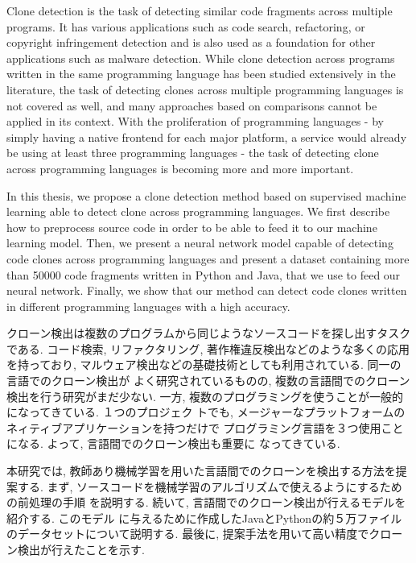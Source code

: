 \begin{eabstract}
Clone detection is the task of detecting similar code fragments across
multiple programs. It has various applications such as code search,
refactoring, or copyright infringement detection and is also used as a
foundation for other applications such as malware detection. While clone
detection across programs written in the same programming language has been
studied extensively in the literature, the task of detecting clones across
multiple programming languages is not covered as well, and many approaches
based on comparisons cannot be applied in its context. With the proliferation
of programming languages - by simply having a native frontend for each major
platform, a service would already be using at least three programming
languages - the task of detecting clone across programming languages is
becoming more and more important.

In this thesis, we propose a clone detection method based on supervised
machine learning able to detect clone across programming languages. We first
describe how to preprocess source code in order to be able to feed it to our
machine learning model. Then, we present a neural network model capable of
detecting code clones across programming languages and present a dataset
containing more than 50000 code fragments written in Python and Java,
that we use to feed our neural network. Finally, we show that our method can
detect code clones written in different programming languages with a high accuracy.
\end{eabstract}

\begin{jabstract}
クローン検出は複数のプログラムから同じようなソースコードを探し出すタスクである.
コード検索, リファクタリング, 著作権違反検出などのような多くの応用を持っており,
マルウェア検出などの基礎技術としても利用されている. 同一の言語でのクローン検出が
よく研究されているものの, 複数の言語間でのクローン検出を行う研究がまだ少ない.
一方, 複数のプログラミングを使うことが一般的になってきている. １つのプロジェク
トでも, メージャーなプラットフォームのネィティブアプリケーションを持つだけで
プログラミング言語を３つ使用ことになる. よって, 言語間でのクローン検出も重要に
なってきている.

本研究では, 教師あり機械学習を用いた言語間でのクローンを検出する方法を提案する.
まず, ソースコードを機械学習のアルゴリズムで使えるようにするための前処理の手順
を説明する. 続いて, 言語間でのクローン検出が行えるモデルを紹介する. このモデル
に与えるために作成したJavaとPythonの約５万ファイルのデータセットについて説明する.
最後に, 提案手法を用いて高い精度でクローン検出が行えたことを示す.
\end{jabstract}
